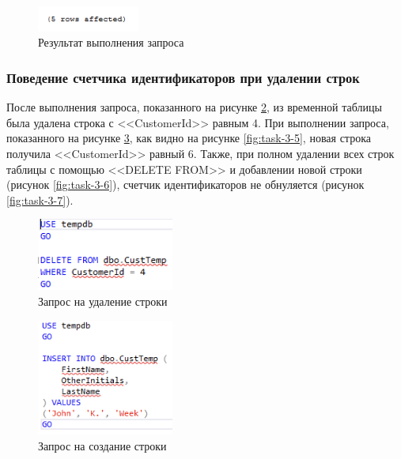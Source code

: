\documentclass[a4paper, 14pt]{extarticle}
\begin{document}
\begin{figure}[H]
  \centering
  \includegraphics[width=0.3\textwidth]{images/task-3/2.png}
  \caption{Результат выполнения запроса}
  \label{fig:task-3-2}
\end{figure}

\subsubsection{Поведение счетчика идентификаторов при удалении строк}

После выполнения запроса, показанного на рисунке \ref{fig:task-3-3}, из
временной таблицы была удалена строка с
<<\foreignlanguage{english}{CustomerId}>> равным 4. При выполнении запроса,
показанного на рисунке \ref{fig:task-3-4}, как видно на рисунке
\ref{fig:task-3-5}, новая строка получила
<<\foreignlanguage{english}{CustomerId}>> равный 6. Также, при полном удалении
всех строк таблицы с помощью <<\foreignlanguage{english}{DELETE FROM}>> и добавлении новой строки (рисунок \ref{fig:task-3-6}),
счетчик идентификаторов не обнуляется (рисунок \ref{fig:task-3-7}).

\begin{figure}[H]
  \centering
  \includegraphics[width=0.4\textwidth]{images/task-3/3.png}
  \caption{Запрос на удаление строки}
  \label{fig:task-3-3}
\end{figure}

\begin{figure}[H]
  \centering
  \includegraphics[width=0.4\textwidth]{images/task-3/4.png}
  \caption{Запрос на создание строки}
  \label{fig:task-3-4}
\end{figure}
\end{document}
